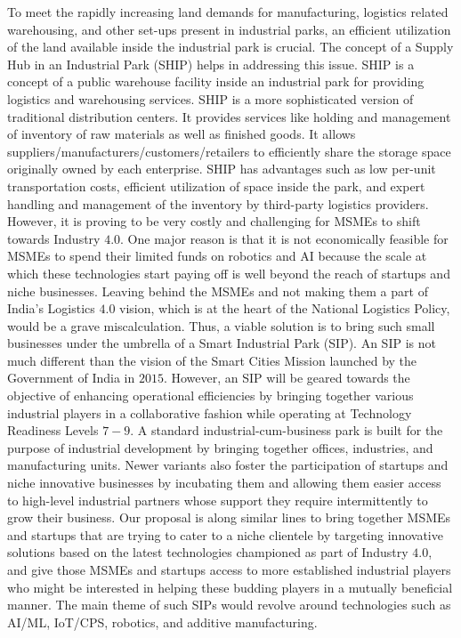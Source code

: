 \documentclass[paper=a4wide, fontsize=12pt]{scrartcl}	 %
\begin{document}
To meet the rapidly increasing land demands for manufacturing, logistics related warehousing, and other set-ups present in industrial parks, an efficient utilization of the land available inside the industrial park is crucial. The concept of a Supply Hub in an Industrial Park (SHIP) helps in addressing this issue. SHIP is a concept of a public warehouse facility inside an industrial park for providing logistics and warehousing services. SHIP is a more sophisticated version of traditional distribution centers. It provides services like holding and management of inventory of raw materials as well as finished goods. It allows suppliers/manufacturers/customers/retailers to efficiently share the storage space originally owned by each enterprise. SHIP has advantages such as low per-unit transportation costs, efficient utilization of space inside the park, and expert handling and management of the inventory by third-party logistics providers. \\

However, it is proving to be very costly and challenging for MSMEs to shift towards Industry $4.0$. One major reason is that it is not economically feasible for MSMEs to spend their limited funds on robotics and AI because the scale at which these technologies start paying off is well beyond the reach of startups and niche businesses. Leaving behind the MSMEs and not making them a part of India's Logistics $4.0$ vision, which is at the heart of the National Logistics Policy, would be a grave miscalculation. Thus, a viable solution is to bring such small businesses under the umbrella of a Smart Industrial Park (SIP). An SIP is not much different than the vision of the Smart Cities Mission launched by the Government of India in $2015$. However, an SIP will be geared towards the objective of enhancing operational efficiencies by bringing together various industrial players in a collaborative fashion while operating at Technology Readiness Levels $7-9$. A standard industrial-cum-business park is built for the purpose of industrial development by bringing together offices, industries, and manufacturing units. Newer variants also foster the participation of startups and niche innovative businesses by incubating them and allowing them easier access to high-level industrial partners whose support they require intermittently to grow their business. Our proposal is along similar lines to bring together MSMEs and startups that are trying to cater to a niche clientele by targeting innovative solutions based on the latest technologies championed as part of Industry $4.0$, and give those MSMEs and startups access to more established industrial players who might be interested in helping these budding players in a mutually beneficial manner. The main theme of such SIPs would revolve around technologies such as AI/ML, IoT/CPS, robotics, and additive manufacturing. \\
\end{document}
